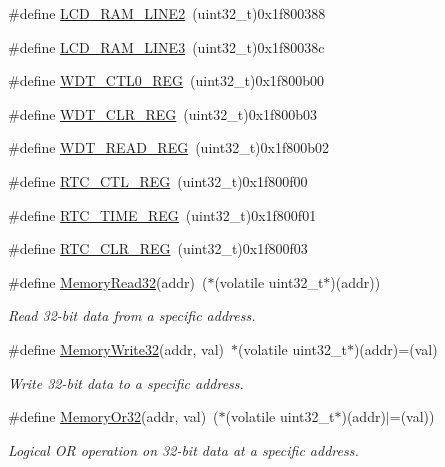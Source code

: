 \begin{DoxyCompactItemize}
\item 
\#define \mbox{\hyperlink{a00020_a61b6d8dbf1f12f9687ef87c1937eb0b1}{L\+C\+D\+\_\+\+R\+A\+M\+\_\+\+L\+I\+N\+E2}}~(uint32\+\_\+t)0x1f800388
\item 
\#define \mbox{\hyperlink{a00020_a91951cfe33cb53d79281b677978b8bbe}{L\+C\+D\+\_\+\+R\+A\+M\+\_\+\+L\+I\+N\+E3}}~(uint32\+\_\+t)0x1f80038c
\item 
\#define \mbox{\hyperlink{a00020_a71148e54881898faf1a67c8210fb61b3}{W\+D\+T\+\_\+\+C\+T\+L0\+\_\+\+R\+EG}}~(uint32\+\_\+t)0x1f800b00
\item 
\#define \mbox{\hyperlink{a00020_a2560b8d7465c0ee0112852677004099f}{W\+D\+T\+\_\+\+C\+L\+R\+\_\+\+R\+EG}}~(uint32\+\_\+t)0x1f800b03
\item 
\#define \mbox{\hyperlink{a00020_ab04902f3d750cf4826ded8350ad5adac}{W\+D\+T\+\_\+\+R\+E\+A\+D\+\_\+\+R\+EG}}~(uint32\+\_\+t)0x1f800b02
\item 
\#define \mbox{\hyperlink{a00020_a327eb68b27f50c95ed803a79b7e86140}{R\+T\+C\+\_\+\+C\+T\+L\+\_\+\+R\+EG}}~(uint32\+\_\+t)0x1f800f00
\item 
\#define \mbox{\hyperlink{a00020_a8743011c78786509baa272db827d3a12}{R\+T\+C\+\_\+\+T\+I\+M\+E\+\_\+\+R\+EG}}~(uint32\+\_\+t)0x1f800f01
\item 
\#define \mbox{\hyperlink{a00020_a5639ee9c54f77e12c49d79e44bfdf60f}{R\+T\+C\+\_\+\+C\+L\+R\+\_\+\+R\+EG}}~(uint32\+\_\+t)0x1f800f03
\item 
\#define \mbox{\hyperlink{a00020_a2d484dc15bdf30ee11ab3b05f31f0e16}{Memory\+Read32}}(addr)~($\ast$(volatile uint32\+\_\+t$\ast$)(addr))
\begin{DoxyCompactList}\small\item\em Read 32-\/bit data from a specific address. \end{DoxyCompactList}\item 
\#define \mbox{\hyperlink{a00020_a6b9732365b12e48ddb89fe1028b975b0}{Memory\+Write32}}(addr,  val)~$\ast$(volatile uint32\+\_\+t$\ast$)(addr)=(val)
\begin{DoxyCompactList}\small\item\em Write 32-\/bit data to a specific address. \end{DoxyCompactList}\item 
\#define \mbox{\hyperlink{a00020_a27874a97deab7cecdde5ddecf466e31e}{Memory\+Or32}}(addr,  val)~($\ast$(volatile uint32\+\_\+t$\ast$)(addr)$\vert$=(val))
\begin{DoxyCompactList}\small\item\em Logical OR operation on 32-\/bit data at a specific address. \end{DoxyCompactList}\item 

\end{DoxyCompactItemize}
